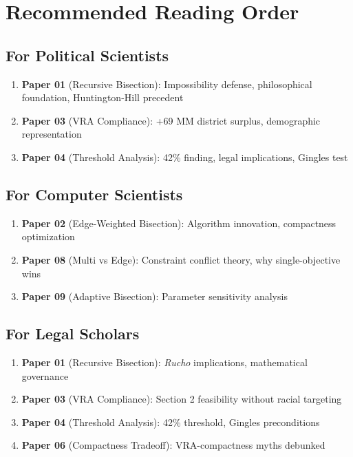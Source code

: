 \documentclass[11pt]{article}
\begin{document}
\section*{Recommended Reading Order}

\subsection*{For Political Scientists}
\begin{enumerate}[leftmargin=*,noitemsep,topsep=2pt]
    \item \textbf{Paper 01} (Recursive Bisection): Impossibility defense, philosophical foundation, Huntington-Hill precedent
    \item \textbf{Paper 03} (VRA Compliance): +69 MM district surplus, demographic representation
    \item \textbf{Paper 04} (Threshold Analysis): 42\% finding, legal implications, Gingles test
\end{enumerate}

\subsection*{For Computer Scientists}
\begin{enumerate}[leftmargin=*,noitemsep,topsep=2pt]
    \item \textbf{Paper 02} (Edge-Weighted Bisection): Algorithm innovation, compactness optimization
    \item \textbf{Paper 08} (Multi vs Edge): Constraint conflict theory, why single-objective wins
    \item \textbf{Paper 09} (Adaptive Bisection): Parameter sensitivity analysis
\end{enumerate}

\subsection*{For Legal Scholars}
\begin{enumerate}[leftmargin=*,noitemsep,topsep=2pt]
    \item \textbf{Paper 01} (Recursive Bisection): \emph{Rucho} implications, mathematical governance
    \item \textbf{Paper 03} (VRA Compliance): Section 2 feasibility without racial targeting
    \item \textbf{Paper 04} (Threshold Analysis): 42\% threshold, Gingles preconditions
    \item \textbf{Paper 06} (Compactness Tradeoff): VRA-compactness myths debunked
\end{enumerate}
\end{document}
